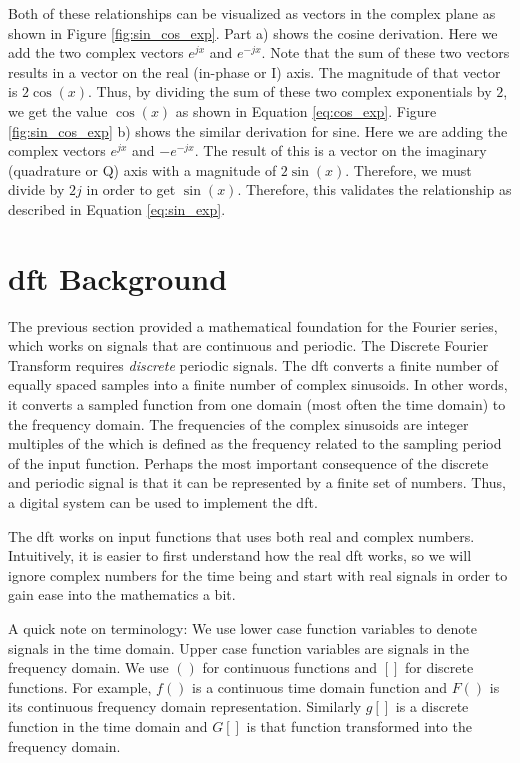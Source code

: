 Both of these relationships can be visualized as vectors in the complex plane as shown in Figure \ref{fig:sin_cos_exp}. Part a) shows the cosine derivation. Here we add the two complex vectors $e^{jx}$ and $e^{-jx}$. Note that the sum of these two vectors results in a vector on the real (in-phase or I) axis. The magnitude of that vector is $2 \cos(x)$. Thus, by dividing the sum of these two complex exponentials by $2$, we get the value $\cos (x)$ as shown in Equation \ref{eq:cos_exp}.  Figure \ref{fig:sin_cos_exp} b) shows the similar derivation for sine. Here we are adding the complex vectors $e^{jx}$ and $-e^{-jx}$. The result of this is a vector on the imaginary (quadrature or Q) axis with a magnitude of $2 \sin (x)$. Therefore, we must divide by $2j$ in order to get $\sin (x)$. Therefore, this validates the relationship as described in Equation \ref{eq:sin_exp}.


\section{\gls{dft} Background}
\label{sec:DFTbackground}

The previous section provided a mathematical foundation for the Fourier series, which works on signals that are continuous and periodic. The Discrete Fourier Transform requires {\it discrete} periodic signals. The \gls{dft} converts a finite number of equally spaced samples into a finite number of complex sinusoids. In other words, it converts a sampled function from one domain (most often the time domain) to the frequency domain. The frequencies of the complex sinusoids are integer multiples of the  which is defined as the frequency related to the sampling period of the input function. Perhaps the most important consequence of the discrete and periodic signal is that it can be represented by a finite set of numbers. Thus, a digital system can be used to implement the \gls{dft}.  

The \gls{dft} works on input functions that uses both real and complex numbers. Intuitively, it is easier to first understand how the real \gls{dft} works, so we will ignore complex numbers for the time being and start with real signals in order to gain ease into the mathematics a bit. 
\begin{aside}
A quick note on terminology: We use lower case function variables to denote signals in the time domain. Upper case function variables are signals in the frequency domain. We use $( )$ for continuous functions and $[ ]$ for discrete functions. For example, $f( )$ is a continuous time domain function and $F( )$ is its continuous frequency domain representation. Similarly $g[ ]$ is a discrete function in the time domain and $G[ ]$ is that function transformed into the frequency domain. 
\end{aside}

